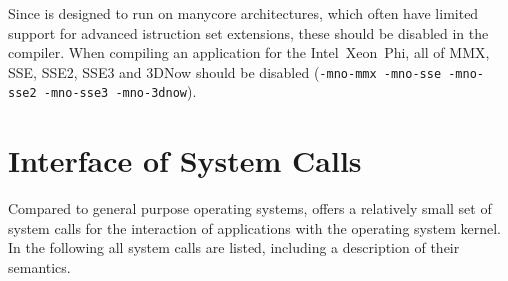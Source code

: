 Since \mythos is designed to run on manycore architectures, which often have limited support for advanced istruction set extensions, these should be disabled in the compiler. When compiling an application for the Intel\textcopyright~Xeon~Phi\texttrademark{}, all of MMX, SSE, SSE2, SSE3 and 3DNow should be disabled (\texttt{-mno-mmx -mno-sse -mno-sse2 -mno-sse3 -mno-3dnow}).


\section{Interface of \mythos System Calls}
Compared to general purpose operating systems, \mythos offers a relatively
small set of system calls for the interaction of applications with the
operating system kernel. In the following all system calls are listed,
including a description of their semantics.

